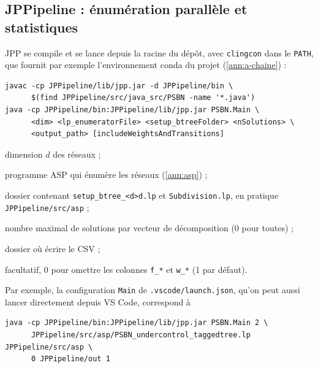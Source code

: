 \subsection{JPPipeline : énumération parallèle et statistiques}
\label{ann:jppipeline}


JPP se compile et se lance depuis la racine du dépôt, avec \texttt{clingcon} dans le \texttt{PATH}, que fournit par exemple l'environnement conda du projet (\cref{ann:a-chaine}) :
{\small
\begin{verbatim}
javac -cp JPPipeline/lib/jpp.jar -d JPPipeline/bin \
      $(find JPPipeline/src/java_src/PSBN -name '*.java')
java -cp JPPipeline/bin:JPPipeline/lib/jpp.jar PSBN.Main \
      <dim> <lp_enumeratorFile> <setup_btreeFolder> <nSolutions> \
      <output_path> [includeWeightsAndTransitions]
\end{verbatim}
}
\begin{description}
\setlength{\itemsep}{0pt}
\item[\texttt{<dim>}] dimension $d$ des réseaux ;
\item[\texttt{<lp\_enumeratorFile>}] programme ASP qui énumère les réseaux (\cref{ann:asp}) ;
\item[\texttt{<setup\_btreeFolder>}] dossier contenant \texttt{setup\_btree\_<d>d.lp} et \texttt{Subdivision.lp}, en pratique \texttt{JPPipeline/src/asp} ;
\item[\texttt{<nSolutions>}] nombre maximal de solutions par vecteur de décomposition (0 pour toutes) ;
\item[\texttt{<output\_path>}] dossier où écrire le CSV ;
\item[{\texttt{[includeWeightsAndTransitions]}}] facultatif, 0 pour omettre les colonnes \texttt{f\_*} et \texttt{w\_*} (1 par défaut).
\end{description}
Par exemple, la configuration \texttt{Main} de \texttt{.vscode/launch.json}, qu'on peut aussi lancer directement depuis VS Code, correspond à
{\small
\begin{verbatim}
java -cp JPPipeline/bin:JPPipeline/lib/jpp.jar PSBN.Main 2 \
      JPPipeline/src/asp/PSBN_undercontrol_taggedtree.lp JPPipeline/src/asp \
      0 JPPipeline/out 1
\end{verbatim}
}

